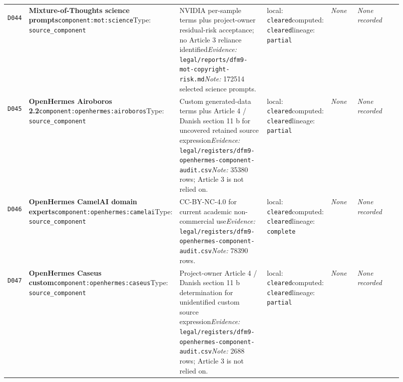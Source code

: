 \documentclass[9pt,a4paper]{article}
\newcommand{\depid}[1]{\hypertarget{dep:#1}{\texttt{#1}}}
\begin{document}
\begin{landscape}
\begin{longtable}{@{}L{0.035\linewidth}L{0.185\linewidth}L{0.27\linewidth}L{0.09\linewidth}L{0.10\linewidth}L{0.24\linewidth}@{}}
\depid{D044} & \textbf{Mixture-of-Thoughts science prompts}\newline \nolinkurl{component:mot:science}\newline Type: \texttt{source\_component} & NVIDIA per-sample terms plus project-owner residual-risk acceptance; no Article 3 reliance identified\newline \textit{Evidence:} \nolinkurl{legal/reports/dfm9-mot-copyright-risk.md}\newline \textit{Note:} 172514 selected science prompts. & local: \texttt{cleared}\newline computed: \texttt{cleared}\newline lineage: \texttt{partial} & \textit{None} & \textit{None recorded} \\
\depid{D045} & \textbf{OpenHermes Airoboros 2.2}\newline \nolinkurl{component:openhermes:airoboros}\newline Type: \texttt{source\_component} & Custom generated-data terms plus Article 4 / Danish section 11 b for uncovered retained source expression\newline \textit{Evidence:} \nolinkurl{legal/registers/dfm9-openhermes-component-audit.csv}\newline \textit{Note:} 35380 rows; Article 3 is not relied on. & local: \texttt{cleared}\newline computed: \texttt{cleared}\newline lineage: \texttt{partial} & \textit{None} & \textit{None recorded} \\
\depid{D046} & \textbf{OpenHermes CamelAI domain experts}\newline \nolinkurl{component:openhermes:camelai}\newline Type: \texttt{source\_component} & CC-BY-NC-4.0 for current academic non-commercial use\newline \textit{Evidence:} \nolinkurl{legal/registers/dfm9-openhermes-component-audit.csv}\newline \textit{Note:} 78390 rows. & local: \texttt{cleared}\newline computed: \texttt{cleared}\newline lineage: \texttt{complete} & \textit{None} & \textit{None recorded} \\
\depid{D047} & \textbf{OpenHermes Caseus custom}\newline \nolinkurl{component:openhermes:caseus}\newline Type: \texttt{source\_component} & Project-owner Article 4 / Danish section 11 b determination for unidentified custom source expression\newline \textit{Evidence:} \nolinkurl{legal/registers/dfm9-openhermes-component-audit.csv}\newline \textit{Note:} 2688 rows; Article 3 is not relied on. & local: \texttt{cleared}\newline computed: \texttt{cleared}\newline lineage: \texttt{partial} & \textit{None} & \textit{None recorded} \\

\end{longtable}
\end{landscape}
\end{document}
